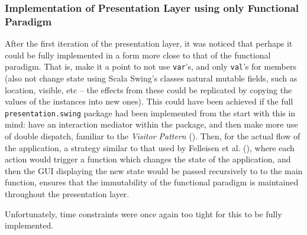 \subsubsection{Implementation of Presentation Layer using only Functional Paradigm}
After the first iteration of the presentation layer, it was noticed that
perhaps it could be fully implemented in a form more close to that of the
functional paradigm. That is, make it a point to not use \texttt{var}'s, and
only \texttt{val}'s for members (also not change state using Scala Swing's
classes natural mutable fields, such as location, visible, etc -- the effects
from these could be replicated by copying the values of the instances into new
ones). This could have been achieved if the full \texttt{presentation.swing}
package had been implemented from the start with this in mind: have an
interaction mediator within the package, and then make more use of double
dispatch, familiar to the \emph{Visitor Pattern}
(\cite[][Ch.~8,~Location~3943]{nikolov2016scala}). Then, for the actual flow of
the application, a strategy similar to that used by Felleisen et al.
(\citeyear[][Ch.~5]{felleisen2013realm}), where each action would trigger a
function which changes the state of the application, and then the GUI
displaying the new state would be passed recursively to to the main function,
ensures that the immutability of the functional paradigm is maintained
throughout the presentation layer.

Unfortunately, time constraints were once again too tight for this to be fully
implemented.
